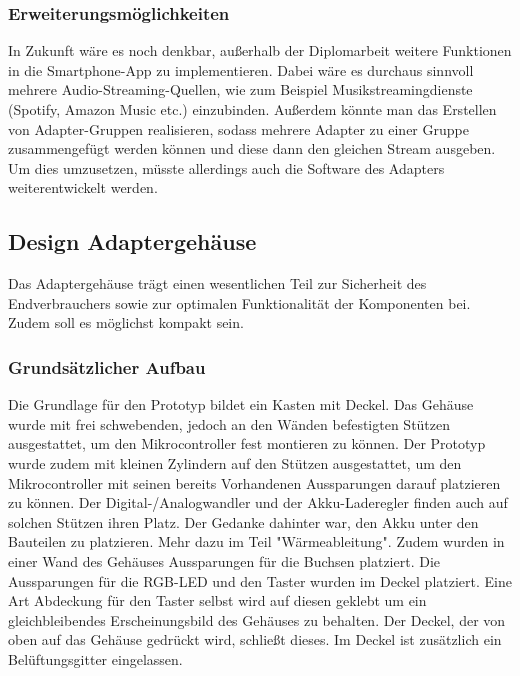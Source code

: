 \documentclass[11pt, twoside]{article}
\begin{document}
\subsubsection{Erweiterungsmöglichkeiten}
In Zukunft wäre es noch denkbar, außerhalb der Diplomarbeit weitere Funktionen in die Smartphone-App zu implementieren. Dabei wäre es durchaus sinnvoll mehrere Audio-Streaming-Quellen, wie zum Beispiel Musikstreamingdienste (Spotify, Amazon Music etc.) einzubinden. Außerdem könnte man das Erstellen von Adapter-Gruppen realisieren, sodass mehrere Adapter zu einer Gruppe zusammengefügt werden können und diese dann den gleichen Stream ausgeben. Um dies umzusetzen, müsste allerdings auch die Software des Adapters weiterentwickelt werden.
\subsection{Design Adaptergehäuse}
Das Adaptergehäuse trägt einen wesentlichen Teil zur Sicherheit des Endverbrauchers sowie zur optimalen
Funktionalität der Komponenten bei. Zudem soll es möglichst kompakt sein.
\subsubsection{Grundsätzlicher Aufbau}
Die Grundlage für den Prototyp bildet ein Kasten mit Deckel.\newline
Das Gehäuse wurde mit frei schwebenden, jedoch an den Wänden befestigten Stützen ausgestattet, um den Mikrocontroller fest montieren zu können. Der Prototyp wurde zudem mit kleinen Zylindern auf den Stützen ausgestattet, um den Mikrocontroller mit seinen bereits Vorhandenen Aussparungen darauf platzieren zu können. Der Digital-/Analogwandler und der Akku-Laderegler finden auch auf solchen Stützen ihren Platz. Der Gedanke dahinter war, den Akku unter den Bauteilen zu platzieren. Mehr dazu im Teil "Wärmeableitung". Zudem wurden in einer Wand des Gehäuses Aussparungen für die Buchsen platziert. Die Aussparungen für die RGB-LED und den Taster wurden im Deckel platziert. Eine Art Abdeckung für den Taster selbst wird auf diesen geklebt um ein gleichbleibendes Erscheinungsbild des Gehäuses zu behalten. Der Deckel, der von oben auf das Gehäuse gedrückt wird, schließt dieses. Im Deckel ist zusätzlich ein Belüftungsgitter eingelassen.
\end{document}
